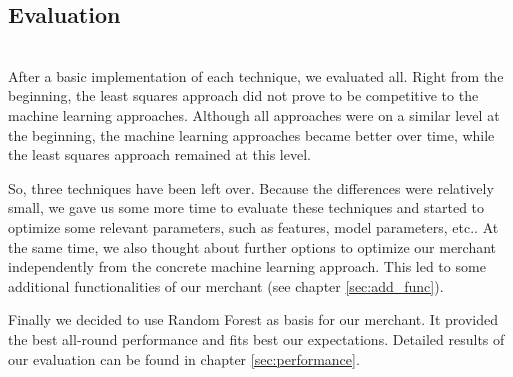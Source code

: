 \subsection{Evaluation}
\label{sec:model_eval}
	~\\
	After a basic implementation of each technique, we evaluated all. Right from the beginning, the least squares approach did not prove to be competitive to the machine learning approaches. Although all approaches were on a similar level at the beginning, the machine learning approaches became better over time, while the least squares approach remained at this level.

	So, three techniques have been left over. Because the differences were relatively small, we gave us some more time to evaluate these techniques and started to optimize some relevant parameters, such as features, model parameters, etc.. At the same time, we also thought about further options to optimize our merchant independently from the concrete machine learning approach. This led to some additional functionalities of our merchant (see chapter \ref{sec:add_func}).

    Finally we decided to use Random Forest as basis for our merchant. It provided the best all-round performance and fits best our expectations. Detailed results of our evaluation can be found in chapter \ref{sec:performance}.
